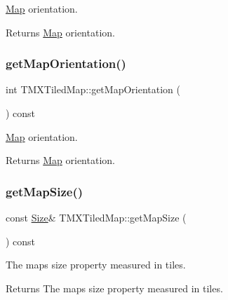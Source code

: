 \hyperlink{classMap}{Map} orientation.

\begin{DoxyReturn}{Returns}
\hyperlink{classMap}{Map} orientation. 
\end{DoxyReturn}
\mbox{\label{classTMXTiledMap_ae977e941934abd13ab85b260ad915941}} 
\subsubsection{\texorpdfstring{get\+Map\+Orientation()}{getMapOrientation()}\hspace{0.1cm}{\footnotesize\ttfamily [2/2]}}
{\footnotesize\ttfamily int T\+M\+X\+Tiled\+Map\+::get\+Map\+Orientation (\begin{DoxyParamCaption}{ }\end{DoxyParamCaption}) const\hspace{0.3cm}{\ttfamily [inline]}}

\hyperlink{classMap}{Map} orientation.

\begin{DoxyReturn}{Returns}
\hyperlink{classMap}{Map} orientation. 
\end{DoxyReturn}
\mbox{\label{classTMXTiledMap_aacf46f135b88bbeb1f023bfc0c2b6242}} 
\subsubsection{\texorpdfstring{get\+Map\+Size()}{getMapSize()}\hspace{0.1cm}{\footnotesize\ttfamily [1/2]}}
{\footnotesize\ttfamily const \hyperlink{classSize}{Size}\& T\+M\+X\+Tiled\+Map\+::get\+Map\+Size (\begin{DoxyParamCaption}{ }\end{DoxyParamCaption}) const\hspace{0.3cm}{\ttfamily [inline]}}

The map\textquotesingle{}s size property measured in tiles.

\begin{DoxyReturn}{Returns}
The map\textquotesingle{}s size property measured in tiles. 
\end{DoxyReturn}
\mbox{\label{classTMXTiledMap_aacf46f135b88bbeb1f023bfc0c2b6242}} 
